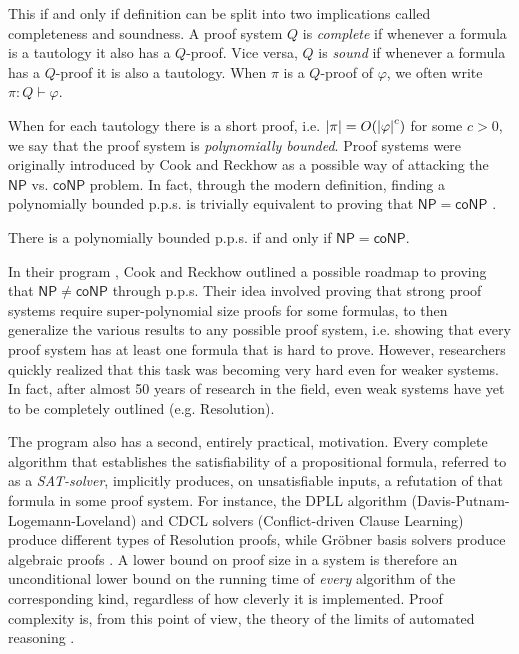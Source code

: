 This if and only if definition can be split into two implications called completeness and soundness. A proof system $Q$ is \textit{complete} if whenever a formula is a tautology it also has a $Q$-proof. Vice versa, $Q$ is \textit{sound} if whenever a formula has a $Q$-proof it is also a tautology. When $\pi$ is a $Q$-proof of $\varphi$, we often write $\pi : Q \vdash \varphi$.

When for each tautology there is a short proof, i.e. $\left|\pi\right| = O(\left|\varphi\right|^c)$ for some $c > 0$, we say that the proof system is \textit{polynomially bounded}. Proof systems were originally introduced by Cook and Reckhow as a possible way of attacking the $\mathsf{NP}$ vs. $\mathsf{coNP}$ problem. In fact, through the modern definition, finding a polynomially bounded p.p.s. is trivially equivalent to proving that $\mathsf{NP} = \mathsf{coNP}$ \cite{cook_proof_compx}.

\begin{proposition}
    There is a polynomially bounded p.p.s. if and only if $\mathsf{NP} = \mathsf{coNP}$.
\end{proposition}

In their program \cite{cook_proof_compx}, Cook and Reckhow outlined a possible roadmap to proving that $\mathsf{NP} \neq \mathsf{coNP}$ through p.p.s. Their idea involved proving that strong proof systems require super-polynomial size proofs for some formulas, to then generalize the various results to any possible proof system, i.e. showing that every proof system has at least one formula that is hard to prove. However, researchers quickly realized that this task was becoming very hard even for weaker systems. In fact, after almost 50 years of research in the field, even weak systems have yet to be completely outlined (e.g. Resolution). 

The program also has a second, entirely practical, motivation. Every complete algorithm that establishes the satisfiability of a propositional formula, referred to as a \textit{SAT-solver}, implicitly produces, on unsatisfiable inputs, a refutation of that formula in some proof system. For instance, the DPLL algorithm (Davis-Putnam-Logemann-Loveland) \cite{davis_putnam, dpll} and CDCL solvers (Conflict-driven Clause Learning) \cite{cdcl_1, cdcl_2} produce different types of Resolution proofs, while Gr\"obner basis solvers produce algebraic proofs \cite{separation_pc_ns}. A lower bound on proof size in a system is therefore an unconditional lower bound on the running time of \emph{every} algorithm of the corresponding kind, regardless of how cleverly it is implemented. Proof complexity is, from this point of view, the theory of the limits of automated reasoning \cite{handbook_sat}.

